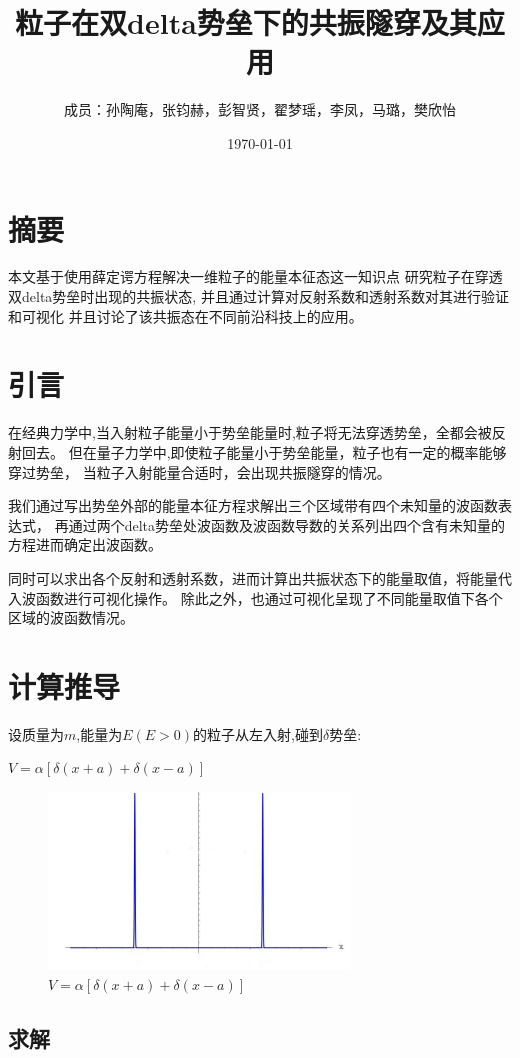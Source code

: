 \documentclass[12pt, a4paper, oneside]{ctexart}
\title{粒子在双delta势垒下的共振隧穿及其应用}
\date{\today}
\author{成员：孙陶庵，张钧赫，彭智贤，翟梦瑶，李凤，马璐，樊欣怡}
\begin{document}
\begin{spacing}{2.0}
\maketitle
\section{摘要}
本文基于使用薛定谔方程解决一维粒子的能量本征态这一知识点
研究粒子在穿透双delta势垒时出现的共振状态,
并且通过计算对反射系数和透射系数对其进行验证和可视化
并且讨论了该共振态在不同前沿科技上的应用。
\section{引言}
在经典力学中,当入射粒子能量小于势垒能量时,粒子将无法穿透势垒，全都会被反射回去。
但在量子力学中,即使粒子能量小于势垒能量，粒子也有一定的概率能够穿过势垒，
当粒子入射能量合适时，会出现共振隧穿的情况。\par
我们通过写出势垒外部的能量本征方程求解出三个区域带有四个未知量的波函数表达式，
再通过两个delta势垒处波函数及波函数导数的关系列出四个含有未知量的方程进而确定出波函数。\par
同时可以求出各个反射和透射系数，进而计算出共振状态下的能量取值，将能量代入波函数进行可视化操作。
除此之外，也通过可视化呈现了不同能量取值下各个区域的波函数情况。
\section{计算推导}
设质量为$m$,能量为$E(E> 0)$的粒子从左入射,碰到$\delta$势垒:\\
\begin{center}
  $V=\alpha[\delta(x+a)+\delta(x-a)]$
\end{center}
\begin{figure}[htbp]
    \centering
    \includegraphics[width=8cm]{delta.jpg}
    \caption{$V=\alpha[\delta(x+a)+\delta(x-a)]$}
\end{figure}
\subsection{求解}


\end{spacing}
\end{document}

